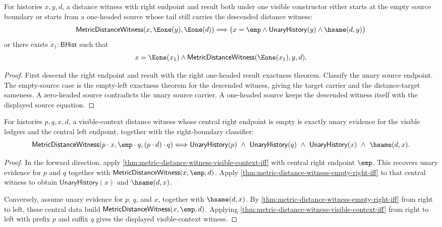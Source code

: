 \begin{theorem}
\label{thm:metric-distance-witness-right-one-headed-source-cases}
For histories $x,y,d$, a distance witness with right endpoint and result both
under one visible constructor either starts at the empty source boundary or
starts from a one-headed source whose tail still carries the descended
distance witness:
$$
\mathsf{MetricDistanceWitness}(x,\Eone(y),\Eone(d))
\Longrightarrow
\bigl(x=\emp\land\mathsf{UnaryHistory}(y)\land\hsame(d,y)\bigr)
$$
or there exists $x_1:\mathsf{BHist}$ such that
$$
x=\Eone(x_1)\land\mathsf{MetricDistanceWitness}(\Eone(x_1),y,d).
$$
\end{theorem}
\begin{proof}
First descend the right endpoint and result with the right one-headed result
exactness theorem. Classify the unary source endpoint. The empty-source case is
the empty-left exactness theorem for the descended witness, giving the target
carrier and the distance-target sameness. A zero-headed source contradicts the
unary source carrier. A one-headed source keeps the descended witness itself
with the displayed source equation.
\end{proof}

\begin{theorem}
\label{thm:metric-distance-witness-right-boundary-visible-context-iff}
For histories $p,q,x,d$, a visible-context distance witness whose central right
endpoint is empty is exactly unary evidence for the visible ledgers and the
central left endpoint, together with the right-boundary classifier:
$$
\mathsf{MetricDistanceWitness}(p\cdot x,\emp\cdot q,(p\cdot d)\cdot q)
\Longleftrightarrow
\mathsf{UnaryHistory}(p)\ \wedge\ \mathsf{UnaryHistory}(q)\ \wedge\
\mathsf{UnaryHistory}(x)\ \wedge\ \hsame(d,x).
$$
\end{theorem}
\begin{proof}
In the forward direction, apply
\autoref{thm:metric-distance-witness-visible-context-iff} with central right
endpoint $\emp$. This recovers unary evidence for $p$ and $q$ together with
$\mathsf{MetricDistanceWitness}(x,\emp,d)$. Apply
\autoref{thm:metric-distance-witness-empty-right-iff} to that central witness to
obtain $\mathsf{UnaryHistory}(x)$ and $\hsame(d,x)$.

Conversely, assume unary evidence for $p$, $q$, and $x$, together with
$\hsame(d,x)$. By
\autoref{thm:metric-distance-witness-empty-right-iff} from right to left, these
central data build $\mathsf{MetricDistanceWitness}(x,\emp,d)$. Applying
\autoref{thm:metric-distance-witness-visible-context-iff} from right to left
with prefix $p$ and suffix $q$ gives the displayed visible-context witness.
\end{proof}

